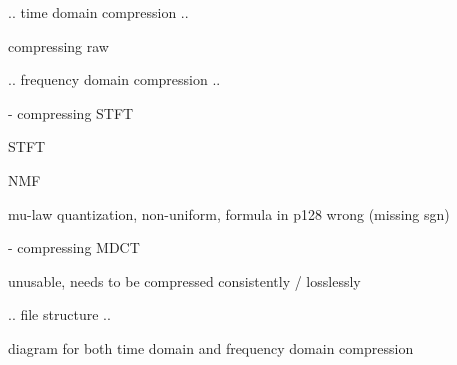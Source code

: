 .. time domain compression ..

compressing raw

.. frequency domain compression ..

- compressing STFT

STFT

NMF

mu-law quantization, non-uniform, formula in p128 wrong (missing sgn)\

- compressing MDCT

unusable, needs to be compressed consistently / losslessly

.. file structure ..

diagram for both time domain and frequency domain compression

